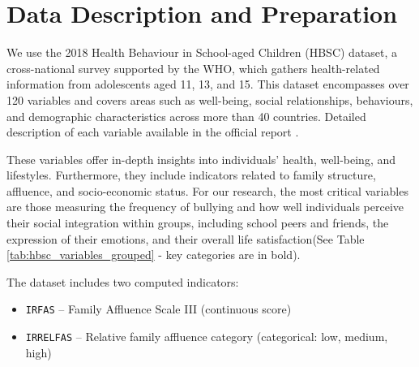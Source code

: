 \documentclass[main.tex]{subfiles}
\begin{document}
\section{Data Description and Preparation}

We use the 2018 Health Behaviour in School-aged Children (HBSC) dataset, a cross-national survey supported by the WHO, which gathers health-related information from adolescents aged 11, 13, and 15. This dataset encompasses over 120 variables and covers areas such as well-being, social relationships, behaviours, and demographic characteristics across more than 40 countries. Detailed description of each variable available in the official report \cite{HBSC2018OA_ed1}. 

These variables offer in-depth insights into individuals' health, well-being, and lifestyles. Furthermore, they include indicators related to family structure, affluence, and socio-economic status. For our research, the most critical variables are those measuring the frequency of bullying and how well individuals perceive their social integration within groups, including school peers and friends, the expression of their emotions, and their overall life satisfaction(See Table \ref{tab:hbsc_variables_grouped}  - key categories are in bold).

The dataset includes two computed indicators:
\begin{itemize}
    \item \texttt{IRFAS} – Family Affluence Scale III (continuous score)
    \item \texttt{IRRELFAS} – Relative family affluence category (categorical: low, medium, high)
\end{itemize}
\end{document}
